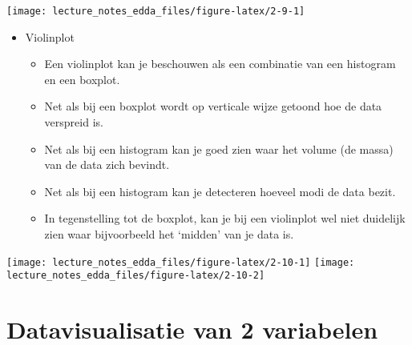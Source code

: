\documentclass[]{memoir}
\providecommand{\tightlist}{%
  \setlength{\itemsep}{0pt}\setlength{\parskip}{0pt}}
\begin{document}
\texttt{[image: lecture\_notes\_edda\_files/figure-latex/2-9-1]}

\begin{itemize}
\tightlist
\item
  Violinplot

  \begin{itemize}
  \tightlist
  \item
    Een violinplot kan je beschouwen als een combinatie van een histogram en een boxplot.
  \item
    Net als bij een boxplot wordt op verticale wijze getoond hoe de data verspreid is.
  \item
    Net als bij een histogram kan je goed zien waar het volume (de massa) van de data zich bevindt.
  \item
    Net als bij een histogram kan je detecteren hoeveel modi de data bezit.
  \item
    In tegenstelling tot de boxplot, kan je bij een violinplot wel niet duidelijk zien waar bijvoorbeeld het `midden' van je data is.
  \end{itemize}
\end{itemize}

\texttt{[image: lecture\_notes\_edda\_files/figure-latex/2-10-1]}
\texttt{[image: lecture\_notes\_edda\_files/figure-latex/2-10-2]}

\hypertarget{datavisualisatie-van-2-variabelen}{%
\section{Datavisualisatie van 2 variabelen}\label{datavisualisatie-van-2-variabelen}}
\end{document}
